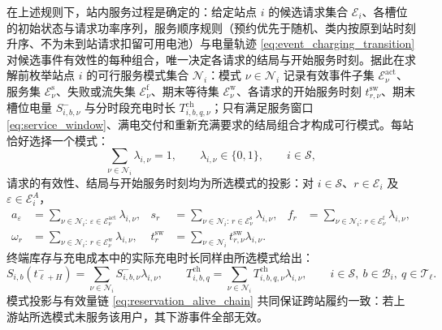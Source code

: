 \documentclass[12pt,a4paper,UTF8]{ctexart}
\begin{document}
在上述规则下，站内服务过程是确定的：给定站点 $i$ 的候选请求集合 $\mathcal E_i$、各槽位的初始状态与请求功率序列，服务顺序规则（预约优先于随机、类内按原到站时刻升序、不为未到站请求扣留可用电池）与电量轨迹 \eqref{eq:event_charging_transition} 对候选事件有效性的每种组合，唯一决定各请求的结局与开始服务时刻。据此在求解前枚举站点 $i$ 的可行服务模式集合 $\mathcal N_i$：模式 $\nu\in\mathcal N_i$ 记录有效事件子集 $\mathcal E_\nu^{\mathrm{act}}$、服务集 $\mathcal E_\nu^{\mathrm{s}}$、失败或流失集 $\mathcal E_\nu^{\mathrm{f}}$、期末等待集 $\mathcal E_\nu^{\mathrm{w}}$、各请求的开始服务时刻 $t_{r,\nu}^{\mathrm{sw}}$、期末槽位电量 $S_{i,b,\nu}^{-}$ 与分时段充电时长 $T_{i,b,q,\nu}^{\mathrm{ch}}$；只有满足服务窗口 \eqref{eq:service_window}、满电交付和重新充满要求的结局组合才构成可行模式。每站恰好选择一个模式：
\begin{equation}
\sum_{\nu\in\mathcal N_i}\lambda_{i,\nu}=1,
\qquad
\lambda_{i,\nu}\in\{0,1\},
\qquad i\in\mathcal S,
\label{eq:station_pattern_convexity}
\end{equation}
请求的有效性、结局与开始服务时刻均为所选模式的投影：对 $i\in\mathcal S$、$r\in\mathcal E_i$ 及 $\varepsilon\in\mathcal E_i^A$，
\begin{subequations}
\label{eq:pattern_projection}
\begin{align}
a_\varepsilon&=
\sum_{\nu\in\mathcal N_i:\,\varepsilon\in\mathcal E_\nu^{\mathrm{act}}}
\lambda_{i,\nu},
&
s_r&=
\sum_{\nu\in\mathcal N_i:\,r\in\mathcal E_\nu^{\mathrm{s}}}
\lambda_{i,\nu},
&
f_r&=
\sum_{\nu\in\mathcal N_i:\,r\in\mathcal E_\nu^{\mathrm{f}}}
\lambda_{i,\nu},
\\
\omega_r&=
\sum_{\nu\in\mathcal N_i:\,r\in\mathcal E_\nu^{\mathrm{w}}}
\lambda_{i,\nu},
&
t_r^{\mathrm{sw}}&=
\sum_{\nu\in\mathcal N_i}
t_{r,\nu}^{\mathrm{sw}}\lambda_{i,\nu}.
\end{align}
\end{subequations}
终端库存与充电成本中的实际充电时长同样由所选模式给出：
\begin{equation}
S_{i,b}(t_{\ell+H}^{-})
=
\sum_{\nu\in\mathcal N_i}
S_{i,b,\nu}^{-}\lambda_{i,\nu},
\qquad
T_{i,b,q}^{\mathrm{ch}}
=
\sum_{\nu\in\mathcal N_i}
T_{i,b,q,\nu}^{\mathrm{ch}}\lambda_{i,\nu},
\qquad i\in\mathcal S,\ b\in\mathcal B_i,\ q\in\mathcal T_\ell.
\label{eq:pattern_state_projection}
\end{equation}
模式投影与有效量链 \eqref{eq:reservation_alive_chain} 共同保证跨站履约一致：若上游站所选模式未服务该用户，其下游事件全部无效。
\end{document}
